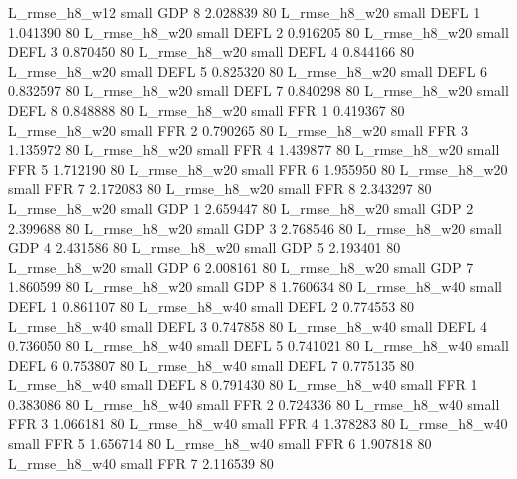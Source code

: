  L_rmse_h8_w12      small      GDP                 8 2.028839 80
 L_rmse_h8_w20      small     DEFL                 1 1.041390 80
 L_rmse_h8_w20      small     DEFL                 2 0.916205 80
 L_rmse_h8_w20      small     DEFL                 3 0.870450 80
 L_rmse_h8_w20      small     DEFL                 4 0.844166 80
 L_rmse_h8_w20      small     DEFL                 5 0.825320 80
 L_rmse_h8_w20      small     DEFL                 6 0.832597 80
 L_rmse_h8_w20      small     DEFL                 7 0.840298 80
 L_rmse_h8_w20      small     DEFL                 8 0.848888 80
 L_rmse_h8_w20      small      FFR                 1 0.419367 80
 L_rmse_h8_w20      small      FFR                 2 0.790265 80
 L_rmse_h8_w20      small      FFR                 3 1.135972 80
 L_rmse_h8_w20      small      FFR                 4 1.439877 80
 L_rmse_h8_w20      small      FFR                 5 1.712190 80
 L_rmse_h8_w20      small      FFR                 6 1.955950 80
 L_rmse_h8_w20      small      FFR                 7 2.172083 80
 L_rmse_h8_w20      small      FFR                 8 2.343297 80
 L_rmse_h8_w20      small      GDP                 1 2.659447 80
 L_rmse_h8_w20      small      GDP                 2 2.399688 80
 L_rmse_h8_w20      small      GDP                 3 2.768546 80
 L_rmse_h8_w20      small      GDP                 4 2.431586 80
 L_rmse_h8_w20      small      GDP                 5 2.193401 80
 L_rmse_h8_w20      small      GDP                 6 2.008161 80
 L_rmse_h8_w20      small      GDP                 7 1.860599 80
 L_rmse_h8_w20      small      GDP                 8 1.760634 80
 L_rmse_h8_w40      small     DEFL                 1 0.861107 80
 L_rmse_h8_w40      small     DEFL                 2 0.774553 80
 L_rmse_h8_w40      small     DEFL                 3 0.747858 80
 L_rmse_h8_w40      small     DEFL                 4 0.736050 80
 L_rmse_h8_w40      small     DEFL                 5 0.741021 80
 L_rmse_h8_w40      small     DEFL                 6 0.753807 80
 L_rmse_h8_w40      small     DEFL                 7 0.775135 80
 L_rmse_h8_w40      small     DEFL                 8 0.791430 80
 L_rmse_h8_w40      small      FFR                 1 0.383086 80
 L_rmse_h8_w40      small      FFR                 2 0.724336 80
 L_rmse_h8_w40      small      FFR                 3 1.066181 80
 L_rmse_h8_w40      small      FFR                 4 1.378283 80
 L_rmse_h8_w40      small      FFR                 5 1.656714 80
 L_rmse_h8_w40      small      FFR                 6 1.907818 80
 L_rmse_h8_w40      small      FFR                 7 2.116539 80
